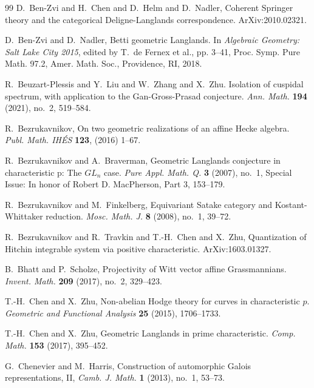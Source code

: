 \documentclass[11pt]{amsart}
\theoremstyle{definition}
\theoremstyle{definition}
\theoremstyle{definition}
\numberwithin{equation}{section}
\begin{document}
\begin{thebibliography}{99}
D.~Ben-Zvi and H.~Chen and D.~Helm and D.~Nadler, Coherent Springer theory and the categorical Deligne-Langlands correspondence. ArXiv:2010.02321.

D.~Ben-Zvi and D.~Nadler, Betti geometric Langlands. In \emph{Algebraic Geometry: Salt Lake City 2015}, edited by T.~de Fernex et al., pp. 3--41, Proc. Symp. Pure Math. 97.2, Amer. Math. Soc., Providence, RI, 2018.

 R.~Beuzart-Plessis and Y.~Liu and W.~Zhang and X.~Zhu. Isolation of cuspidal spectrum, with application to the Gan-Gross-Prasad conjecture. \emph{Ann. Math.} \textbf{194} (2021), no.~2, 519--584.

R.~Bezrukavnikov, On two geometric realizations of an affine Hecke algebra. \emph{Publ. Math. IH\'ES} \textbf{123}, (2016) 1--67.

R.~Bezrukavnikov and A.~Braverman, Geometric Langlands
conjecture in characteristic p: The $GL_n$ case. \emph{Pure Appl. Math. Q.} \textbf{3} (2007), no.~1, Special Issue: In honor of Robert D. MacPherson, Part 3, 153--179.

R.~Bezrukavnikov and M.~Finkelberg, Equivariant Satake category and Kostant-Whittaker reduction. \emph{Mosc. Math. J.} \textbf{8} (2008), no.~1, 39--72.

R.~Bezrukavnikov and R.~Travkin and T.-H.~Chen and X.~Zhu, Quantization of Hitchin integrable system via positive characteristic. ArXiv:1603.01327.

B.~Bhatt and P.~Scholze, Projectivity of Witt vector affine Grassmannians. \emph{Invent. Math.} \textbf{209} (2017), no.~2, 329--423.

T.-H.~Chen and X.~Zhu, Non-abelian Hodge theory for curves in characteristic $p$. \emph{Geometric and Functional Analysis} \textbf{25} (2015), 1706--1733.

T.-H.~Chen and X.~Zhu, Geometric Langlands in prime characteristic. \emph{Comp. Math.} \textbf{153} (2017), 395--452.

G.~Chenevier and M.~Harris, Construction of automorphic Galois representations, II, \emph{Camb. J. Math.} \textbf{1} (2013), no.~1, 53--73.


\end{thebibliography}
\end{document}
